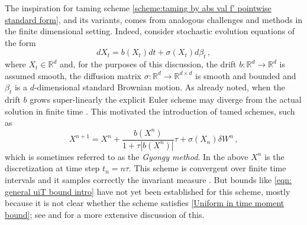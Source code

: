 \documentclass[reqno, 11pt]{amsart}
\theoremstyle{plain}
\theoremstyle{definition}
\theoremstyle{remark}
\numberwithin{equation}{section}
\numberwithin{theorem}{section}
\newcommand{\R}{\mathbb{R}}
\begin{document}
{The inspiration for taming scheme \eqref{scheme:taming by abs val f' pointwise standard form}, and its variants, comes from analogous challenges and methods in the finite dimensional setting.  Indeed, consider stochastic evolution equations of the  form 
\begin{equation}\label{generalSDE}
dX_t = b(X_t) dt+ \sigma(X_t) d\beta_t \,,
\end{equation}
where $X_t \in \R^d$ and, for the purposes of this discussion,   the drift $b:\R^d\rightarrow \R^d$ is assumed smooth, the diffusion matrix $\sigma: \R^d \rightarrow \R^{d\times d}$ is smooth and bounded  and $\beta_t$ is a $d$-dimensional standard Brownian motion.  As already noted, when the drift $b$ grows super-linearly the explicit Euler scheme may diverge from the actual solution in finite time \cite{mattingly2002ergodicity}. This motivated the introduction of tamed schemes, such as   
\begin{equation}\label{SDEclassicaltaming}
X^{n+1}=X^n+ \frac{b(X^n)}{1+\tau |b(X^n)|} \tau + \sigma(X_n) \delta W^n \,,   
\end{equation}
which is sometimes referred to as the {\em Gyongy method}. In the above $X^n$ is the discretization at time step $t_n=n\tau$. 
This scheme is convergent over finite time intervals \cite{gyongy2005discretization} and  it samples correctly the invariant measure \cite{brehier2022approximation}.  But bounds like \eqref{eqn: general uiT bound intro} have not yet been established for this scheme, mostly because it is not clear whether the scheme satisfies \ref{Uniform in time moment bound}; see \cite{brehier2022approximation} and \cite[Section 5]{Angeli} for a more extensive discussion of this.



}
\end{document}
